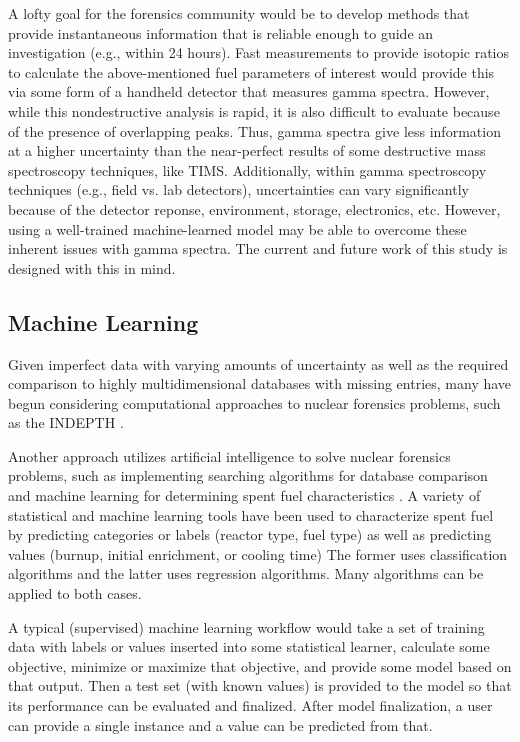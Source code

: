\documentclass{anstrans}
\begin{document}
A lofty goal for the forensics community would be to develop methods that
provide instantaneous information that is reliable enough to guide an
investigation (e.g., within 24 hours). Fast measurements to provide isotopic
ratios to calculate the above-mentioned fuel parameters of interest would
provide this via some form of a handheld detector that measures gamma spectra.
However, while this nondestructive analysis is rapid, it is also difficult to
evaluate because of the presence of overlapping peaks.  Thus, gamma spectra
give less information at a higher uncertainty than the near-perfect results of
some destructive mass spectroscopy techniques, like TIMS.  Additionally, within gamma spectroscopy techniques (e.g., field
vs. lab detectors), uncertainties can vary significantly because of the
detector reponse, environment, storage, electronics, etc.  However, using a
well-trained machine-learned model may be able to overcome these inherent
issues with gamma spectra. The current and future work of this study is
designed with this in mind. 

\subsection{Machine Learning}

Given imperfect data with varying amounts of uncertainty as well as the
required comparison to highly multidimensional databases with missing entries,
many have begun considering computational approaches to nuclear forensics
problems, such as the INDEPTH \cite{weber_2006, weber_2010, weber_2011}.

Another approach utilizes artificial intelligence to solve nuclear forensics
problems, such as implementing searching algorithms for database comparison and
machine learning for determining spent fuel characteristics 
\cite{dayman_2013, robel_2009, pu_discrimination, jones_viz_2014, jones_snf_2014}.  
A variety of statistical and machine
learning tools have been used to characterize spent fuel by predicting
categories or labels (reactor type, fuel type) as well as predicting values
(burnup, initial enrichment, or cooling time) The former uses classification
algorithms and the latter uses regression algorithms. Many algorithms can be
applied to both cases.

A typical (supervised) machine learning workflow would take a set of training
data with labels or values inserted into some statistical learner, calculate
some objective, minimize or maximize that objective, and provide some model
based on that output. Then a test set (with known values) is provided to the
model so that its performance can be evaluated and finalized. After model
finalization, a user can provide a single instance and a value can be predicted
from that.
\end{document}
